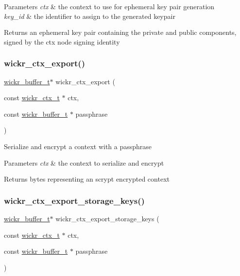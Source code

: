 \begin{DoxyParams}{Parameters}
{\em ctx} & the context to use for ephemeral key pair generation \\
\hline
{\em key\+\_\+id} & the identifier to assign to the generated keypair \\
\hline
\end{DoxyParams}
\begin{DoxyReturn}{Returns}
an ephemeral key pair containing the private and public components, signed by the ctx node signing identity 
\end{DoxyReturn}
\mbox{\label{group__wickr__ctx_ga56c41d96d28a8a25336147248361dcb6}} 
\subsubsection{\texorpdfstring{wickr\_ctx\_export()}{wickr\_ctx\_export()}}
{\footnotesize\ttfamily \mbox{\hyperlink{structwickr__buffer}{wickr\+\_\+buffer\+\_\+t}}$\ast$ wickr\+\_\+ctx\+\_\+export (\begin{DoxyParamCaption}\item[{const \mbox{\hyperlink{structwickr__ctx}{wickr\+\_\+ctx\+\_\+t}} $\ast$}]{ctx,  }\item[{const \mbox{\hyperlink{structwickr__buffer}{wickr\+\_\+buffer\+\_\+t}} $\ast$}]{passphrase }\end{DoxyParamCaption})}

Serialize and encrypt a context with a passphrase


\begin{DoxyParams}{Parameters}
{\em ctx} & the context to serialize and encrypt \\
\hline
\end{DoxyParams}
\begin{DoxyReturn}{Returns}
bytes representing an scrypt encrypted context 
\end{DoxyReturn}
\mbox{\label{group__wickr__ctx_ga67e64bed3fc0a8ee550c0fc24d44c787}} 
\subsubsection{\texorpdfstring{wickr\_ctx\_export\_storage\_keys()}{wickr\_ctx\_export\_storage\_keys()}}
{\footnotesize\ttfamily \mbox{\hyperlink{structwickr__buffer}{wickr\+\_\+buffer\+\_\+t}}$\ast$ wickr\+\_\+ctx\+\_\+export\+\_\+storage\+\_\+keys (\begin{DoxyParamCaption}\item[{const \mbox{\hyperlink{structwickr__ctx}{wickr\+\_\+ctx\+\_\+t}} $\ast$}]{ctx,  }\item[{const \mbox{\hyperlink{structwickr__buffer}{wickr\+\_\+buffer\+\_\+t}} $\ast$}]{passphrase }\end{DoxyParamCaption})}

